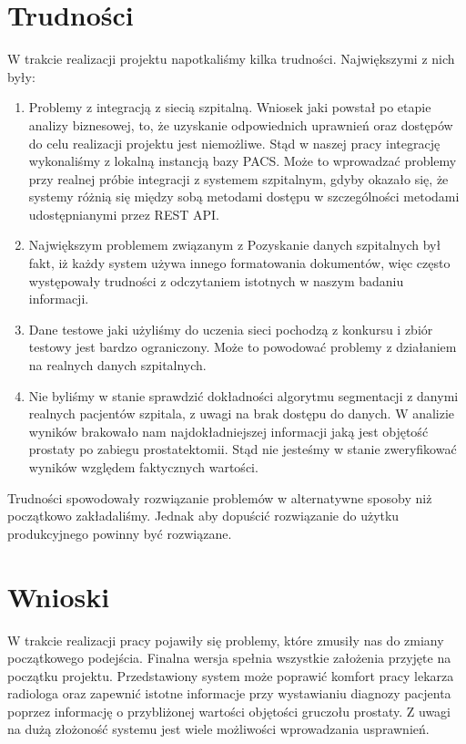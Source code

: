 \documentclass[a4paper,11pt,twoside]{report}
\theoremstyle{definition}
\begin{document}
\section{Trudności}
W trakcie realizacji projektu napotkaliśmy kilka trudności. Największymi z nich były:
\begin{enumerate}
\item Problemy z integracją z siecią szpitalną. Wniosek jaki powstał po etapie analizy biznesowej, to, że uzyskanie odpowiednich uprawnień oraz dostępów do celu realizacji projektu jest niemożliwe. Stąd w naszej pracy integrację wykonaliśmy z lokalną instancją bazy PACS. Może to wprowadzać problemy przy realnej próbie integracji z systemem szpitalnym, gdyby okazało się, że systemy różnią się między sobą metodami dostępu w szczególności metodami udostępnianymi przez REST API.
\item  Największym problemem związanym z Pozyskanie danych szpitalnych był fakt, iż każdy system używa innego formatowania dokumentów, więc często występowały trudności z odczytaniem istotnych w naszym badaniu informacji.
\item Dane testowe jaki użyliśmy do uczenia sieci pochodzą z konkursu i zbiór testowy jest bardzo ograniczony. Może to powodować problemy z działaniem na realnych danych szpitalnych. 
\item Nie byliśmy w stanie sprawdzić dokładności algorytmu segmentacji z danymi realnych pacjentów szpitala, z uwagi na brak dostępu do danych. W analizie wyników brakowało nam najdokładniejszej informacji jaką jest objętość prostaty po zabiegu prostatektomii. Stąd nie jesteśmy w stanie zweryfikować wyników względem faktycznych wartości.
\end{enumerate}
Trudności spowodowały rozwiązanie problemów w alternatywne sposoby niż początkowo zakładaliśmy. Jednak  aby dopuścić rozwiązanie do użytku produkcyjnego powinny być rozwiązane. 

\section{Wnioski}
W trakcie realizacji pracy pojawiły się problemy, które zmusiły nas do zmiany początkowego podejścia. Finalna wersja spełnia wszystkie założenia przyjęte na początku projektu. Przedstawiony system może poprawić komfort pracy lekarza radiologa oraz zapewnić istotne informacje przy wystawianiu diagnozy pacjenta poprzez informację o przybliżonej wartości objętości gruczołu prostaty. Z uwagi na dużą złożoność systemu jest wiele możliwości wprowadzania usprawnień.
\end{document}
